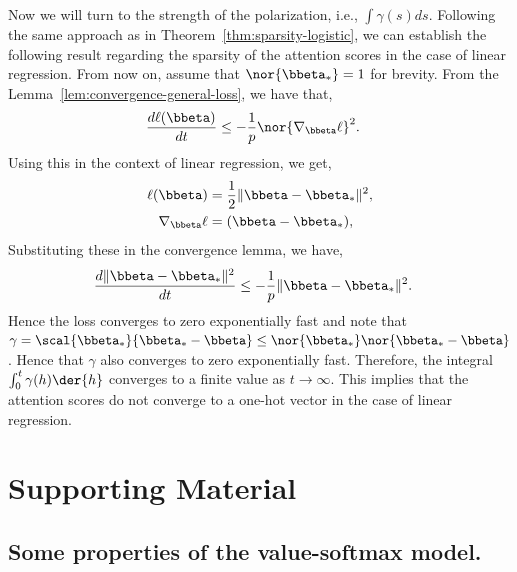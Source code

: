 \documentclass{article}
\theoremstyle{plain}
\theoremstyle{definition}
\theoremstyle{remark}
\begin{document}
Now we will turn to the strength of the polarization, i.e., $\int \gamma(s) ds .$ Following the same approach as in Theorem~\ref{thm:sparsity-logistic}, we can establish the following result regarding the sparsity of the attention scores in the case of linear regression. From now on, assume that $\nor{\bbeta_*} = 1$ for brevity. From the Lemma~\ref{lem:convergence-general-loss}, we have that,
\begin{align*}
    \frac{ d \ell(\bbeta)}{dt} &\leq - \frac{1}{p} \nor{\nabla_{\bbeta} \ell}^2.
 \end{align*}
Using this in the context of linear regression, we get, 
\begin{align*}
    \ell(\bbeta) &= \frac{1}{2} \| \bbeta - \bbeta_* \|^2, \\
    \nabla_{\bbeta} \ell &= ( \bbeta - \bbeta_* ), 
\end{align*}
Substituting these in the convergence lemma, we have, 
\begin{align*}
     \frac{d \| \bbeta - \bbeta_* \|^2 }{dt} &\leq - \frac{1}{p} \| \bbeta - \bbeta_* \|^2. 
\end{align*}
Hence the loss converges to zero exponentially fast and note that 
$\gamma = \scal{ \bbeta_*}{\bbeta_* - \bbeta} \leq \nor{\bbeta_*} \nor{\bbeta_* - \bbeta}$. Hence that $\gamma$ also converges to zero exponentially fast. Therefore, the integral $\int_{0}^{t} \gamma(h) \der{h}$ converges to a finite value as $t \to \infty$. This implies that the attention scores do not converge to a one-hot vector in the case of linear regression.



\section{Supporting Material}

\subsection{Some properties of the value-softmax model.}
\end{document}
